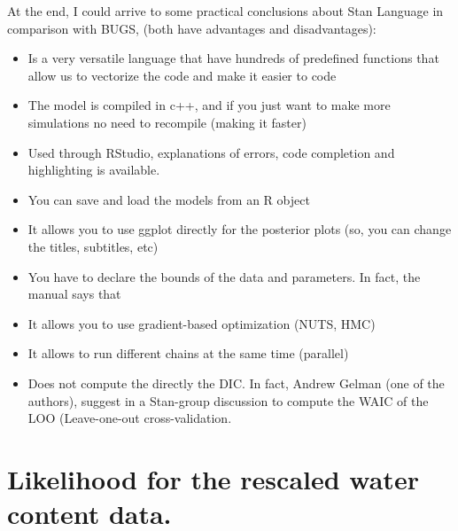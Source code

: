 \documentclass{article}
\begin{document}
At the end, I could arrive to some practical conclusions about Stan Language in comparison with BUGS, (both have advantages and disadvantages):

\begin{itemize}
\item{Is a very versatile language that have hundreds of predefined functions that allow us to vectorize the code and make it easier to code }

\item{The model is compiled in c++, and if you just want to make more simulations no need to recompile (making it faster)}
\item{Used through RStudio, explanations of errors, code completion and highlighting is available.}

\item{You can save and load the models from an R object}

\item{It allows you to use ggplot directly for the posterior plots (so, you can change the titles, subtitles, etc)}

\item{You have to declare the bounds of the data and parameters. In fact, the manual says that }

\item{It allows you to use gradient-based optimization (NUTS, HMC)}

\item{It allows to run different chains at the same time (parallel)}

\item{Does not compute the directly the DIC. In fact, Andrew Gelman (one of the authors), suggest in a Stan-group discussion to compute the WAIC of the LOO (Leave-one-out cross-validation.}
\end{itemize}

\section{Likelihood for the rescaled water content data.}
\end{document}
